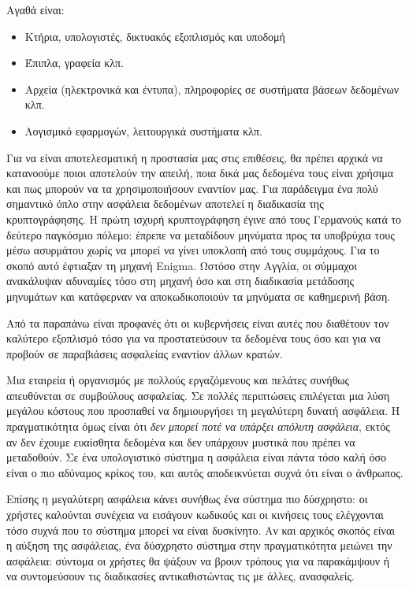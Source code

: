 Αγαθά είναι:

\begin{itemize}
\item Κτήρια, υπολογιστές, δικτυακός εξοπλισμός και υποδομή
\item Έπιπλα, γραφεία κλπ.
\item Αρχεία (ηλεκτρονικά και έντυπα), πληροφορίες σε συστήματα βάσεων δεδομένων κλπ.
\item Λογισμικό εφαρμογών, λειτουργικά συστήματα κλπ.
\end{itemize}

Για να είναι αποτελεσματική η προστασία μας στις επιθέσεις, θα πρέπει αρχικά να κατανοούμε ποιοι αποτελούν την απειλή, ποια δικά μας δεδομένα τους είναι χρήσιμα και πως μπορούν να τα χρησιμοποιήσουν εναντίον μας. Για παράδειγμα ένα πολύ σημαντικό όπλο στην ασφάλεια δεδομένων αποτελεί η διαδικασία της κρυπτογράφησης. Η πρώτη ισχυρή κρυπτογράφηση έγινε από τους Γερμανούς κατά το δεύτερο παγκόσμιο πόλεμο: έπρεπε να μεταδίδουν μηνύματα προς τα υποβρύχια τους μέσω ασυρμάτου χωρίς να μπορεί να γίνει υποκλοπή από τους συμμάχους. Για το σκοπό αυτό έφτιαξαν τη μηχανή Enigma. Ωστόσο στην Αγγλία, οι σύμμαχοι ανακάλυψαν αδυναμίες τόσο στη μηχανή όσο και στη διαδικασία μετάδοσης μηνυμάτων και κατάφερναν να αποκωδικοποιούν τα μηνύματα σε καθημερινή βάση.

Από τα παραπάνω είναι προφανές ότι οι κυβερνήσεις είναι αυτές που διαθέτουν τον καλύτερο εξοπλισμό τόσο για να προστατεύσουν τα δεδομένα τους όσο και για να προβούν σε παραβιάσεις ασφαλείας εναντίον άλλων κρατών. 

Μια εταιρεία ή οργανισμός με πολλούς εργαζόμενους και πελάτες συνήθως απευθύνεται σε συμβούλους ασφαλείας. Σε πολλές περιπτώσεις επιλέγεται μια λύση μεγάλου κόστους που προσπαθεί να δημιουργήσει τη μεγαλύτερη δυνατή ασφάλεια. Η πραγματικότητα όμως είναι ότι \emph{δεν μπορεί ποτέ να υπάρξει απόλυτη ασφάλεια}, εκτός αν δεν έχουμε ευαίσθητα δεδομένα και δεν υπάρχουν μυστικά που πρέπει να μεταδοθούν. Σε ένα υπολογιστικό σύστημα η ασφάλεια είναι πάντα τόσο καλή όσο είναι ο πιο αδύναμος κρίκος του, και αυτός αποδεικνύεται συχνά ότι είναι ο άνθρωπος. 

Επίσης η μεγαλύτερη ασφάλεια κάνει συνήθως ένα σύστημα πιο δύσχρηστο: οι χρήστες καλούνται συνέχεια να εισάγουν κωδικούς και οι κινήσεις τους ελέγχονται τόσο συχνά που το σύστημα μπορεί να είναι δυσκίνητο. Αν και αρχικός σκοπός είναι η αύξηση της ασφάλειας, ένα δύσχρηστο σύστημα στην πραγματικότητα μειώνει την ασφάλεια: σύντομα οι χρήστες θα ψάξουν να βρουν τρόπους για να παρακάμψουν ή να συντομεύσουν τις διαδικασίες αντικαθιστώντας τις με άλλες, ανασφαλείς.

